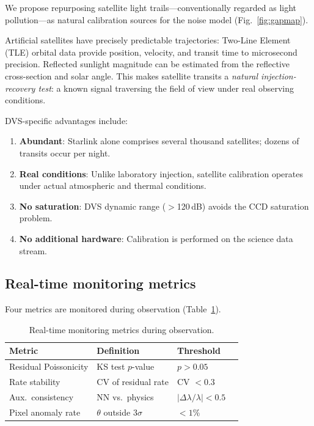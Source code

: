 \documentclass[twocolumn]{article}
\begin{document}
We propose repurposing satellite light trails---conventionally regarded as light pollution---as natural calibration sources for the noise model (Fig.~\ref{fig:gapmap}).

Artificial satellites have precisely predictable trajectories: Two-Line Element (TLE) orbital data provide position, velocity, and transit time to microsecond precision.
Reflected sunlight magnitude can be estimated from the reflective cross-section and solar angle.
This makes satellite transits a \emph{natural injection-recovery test}: a known signal traversing the field of view under real observing conditions.

DVS-specific advantages include:
\begin{enumerate}
  \item \textbf{Abundant}: Starlink alone comprises several thousand satellites; dozens of transits occur per night.
  \item \textbf{Real conditions}: Unlike laboratory injection, satellite calibration operates under actual atmospheric and thermal conditions.
  \item \textbf{No saturation}: DVS dynamic range ($>$120\,dB) avoids the CCD saturation problem.
  \item \textbf{No additional hardware}: Calibration is performed on the science data stream.
\end{enumerate}

\subsection{Real-time monitoring metrics}

Four metrics are monitored during observation (Table~\ref{tab:monitoring}).

\begin{table}[htbp]
\centering
\caption{Real-time monitoring metrics during observation.}
\label{tab:monitoring}
\begin{tabular}{@{}llll@{}}
\toprule
Metric & Definition & Threshold \\
\midrule
Residual Poissonicity & KS test $p$-value & $p > 0.05$ \\
Rate stability & CV of residual rate & CV $< 0.3$ \\
Aux.\ consistency & NN vs.\ physics & $|\Delta\lambda/\lambda| < 0.5$ \\
Pixel anomaly rate & $\theta$ outside $3\sigma$ & $< 1$\% \\
\bottomrule
\end{tabular}
\end{table}
\end{document}
